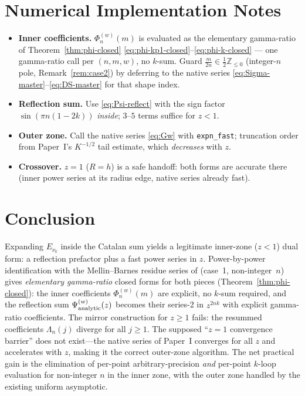 \documentclass{article}
\begin{document}
\section{Numerical Implementation Notes}
\label{sec:numerics}

\begin{itemize}
\item \textbf{Inner coefficients.}  $\Phi^{(w)}_n(m)$ is evaluated as the
elementary gamma-ratio of Theorem~\ref{thm:phi-closed}
\eqref{eq:phi-kp1-closed}--\eqref{eq:phi-k-closed} --- one gamma-ratio call per
$(n,m,w)$, no $k$-sum.  Guard $\tfrac{m}{2n}\in\tfrac12\mathbb{Z}_{\le 0}$
(integer-$n$ pole, Remark~\ref{rem:case2}) by deferring to the native series
\eqref{eq:Sigma-master}--\eqref{eq:DS-master} for that shape index.
\item \textbf{Reflection sum.}  Use \eqref{eq:Psi-reflect} with the sign factor
$\sin(\pi n(1-2k))$ \emph{inside}; $3$--$5$ terms suffice for $z<1$.
\item \textbf{Outer zone.}  Call the native series \eqref{eq:Gw} with
\texttt{expn\_fast}; truncation order from Paper~I's $K^{-1/2}$ tail estimate,
which \emph{decreases} with $z$.
\item \textbf{Crossover.}  $z=1$ ($R=h$) is a safe handoff: both forms are
accurate there (inner power series at its radius edge, native series already
fast).
\end{itemize}

\section{Conclusion}
\label{sec:conclusion}

Expanding $E_{\nu_k}$ inside the Catalan sum yields a legitimate inner-zone
($z<1$) dual form: a reflection prefactor plus a fast power series in $z$.
Power-by-power identification with the Mellin--Barnes residue series of
\citet{RetanaMontenegro2012} (case~1, non-integer~$n$) gives \emph{elementary
gamma-ratio} closed forms for both pieces (Theorem~\ref{thm:phi-closed}):
the inner coefficients $\Phi^{(w)}_n(m)$ are explicit, no $k$-sum required,
and the reflection sum $\Psi^{(w)}_{\rm analytic}(z)$ becomes their
series-2 in $z^{2nk}$ with explicit gamma-ratio coefficients.  The mirror
construction for $z\ge1$ fails: the resummed coefficients $\Lambda_n(j)$
diverge for all $j\ge1$.  The supposed ``$z=1$ convergence barrier'' does not
exist---the native series of Paper~I converges for all $z$ and accelerates
with $z$, making it the correct outer-zone algorithm.  The net practical gain
is the elimination of per-point arbitrary-precision \emph{and} per-point
$k$-loop evaluation for non-integer $n$ in the inner zone, with the outer
zone handled by the existing uniform asymptotic.
\end{document}
